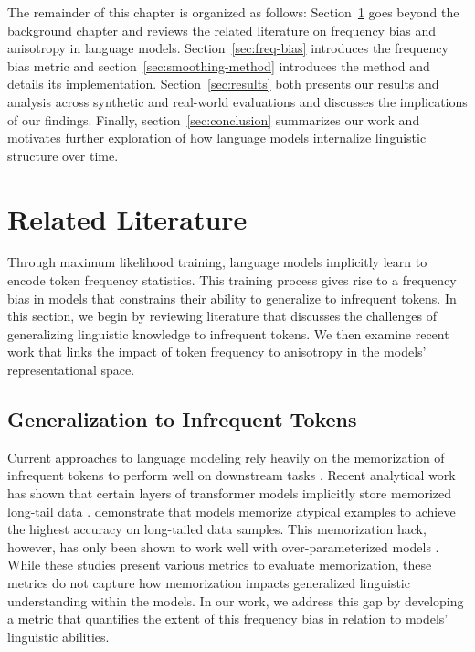 The remainder of this chapter is organized as follows: Section~\ref{sec:related-literature} goes beyond the background chapter and reviews the related literature on frequency bias and anisotropy in language models. Section~\ref{sec:freq-bias} introduces the frequency bias metric and section~\ref{sec:smoothing-method} introduces the \smoothing method and details its implementation. Section~\ref{sec:results} both presents our results and analysis across synthetic and real-world evaluations and discusses the implications of our findings. Finally, section~\ref{sec:conclusion} summarizes our work and motivates further exploration of how language models internalize linguistic structure over time.

\section{Related Literature}
\label{sec:related-literature}

Through maximum likelihood training, language models implicitly learn to encode token frequency statistics. This training process gives rise to a frequency bias in models that constrains their ability to generalize to infrequent tokens. In this section, we begin by reviewing literature that discusses the challenges of generalizing linguistic knowledge to infrequent tokens. We then examine recent work that links the impact of token frequency to anisotropy in the models' representational space.

\subsection{Generalization to Infrequent Tokens}

Current approaches to language modeling rely heavily on the memorization of infrequent tokens to perform well on downstream tasks \citep{feldman2020does}. Recent analytical work has shown that certain layers of transformer models implicitly store memorized long-tail data \citep{haviv2023understanding, kobayashi2023transformer}. \citet{feldman2020neural} demonstrate that models memorize atypical examples to achieve the highest accuracy on long-tailed data samples. This memorization hack, however, has only been shown to work well with over-parameterized models \citep{belkin2019reconciling}. While these studies present various metrics to evaluate memorization, these metrics do not capture how memorization impacts generalized linguistic understanding within the models. In our work, we address this gap by developing a metric that quantifies the extent of this frequency bias in relation to models' linguistic abilities.

